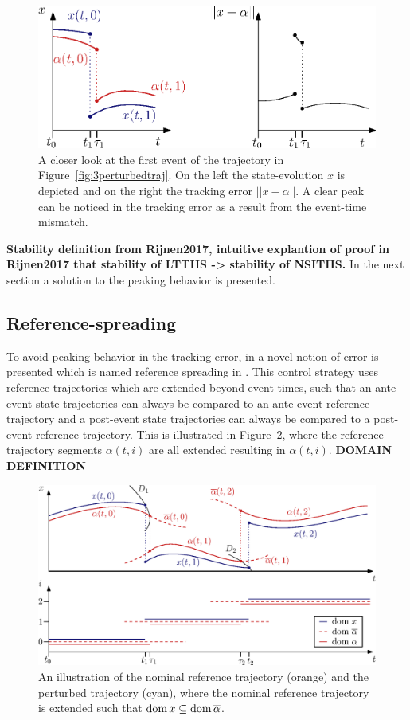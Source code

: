 \documentclass[../DC2017114Bouma.tex]{subfiles}
\begin{document}
\begin{figure}[h]
\centering
\includegraphics[width=.66\textwidth]{peakerror.eps}\caption{A closer look at the first event of the trajectory in Figure~\ref{fig:3perturbedtraj}. On the left the state-evolution $x$ is depicted and on the right the tracking error $||x-\alpha||$. A clear peak can be noticed in the tracking error as a result from the event-time mismatch.} \label{fig:3peakerror}
\end{figure}

\textbf{Stability definition from Rijnen2017, intuitive explantion of proof in Rijnen2017 that stability of LTTHS -> stability of NSITHS.} In the next section a solution to the peaking behavior is presented.

\subsection{Reference-spreading}
To avoid peaking behavior in the tracking error, in \cite{Saccon2014} a novel notion of error is presented which is named reference spreading in \cite{Rijnen2016}. This control strategy uses reference trajectories which are extended beyond event-times, such that an ante-event state trajectories can always be compared to an ante-event reference trajectory and a post-event state trajectories can always be compared to a post-event reference trajectory. This is illustrated in Figure~\ref{fig:3refspread}, where the reference trajectory segments $\alpha(t,i)$ are all extended resulting in $\overline{\alpha}(t,i)$.
\textbf{DOMAIN DEFINITION}
\begin{figure}[h]
\centering
\includegraphics[width=.8\textwidth]{refspreaddom.eps}\caption{An illustration of the nominal reference trajectory (orange) and the perturbed trajectory (cyan), where the nominal reference trajectory is extended such that $\operatorname{\textnormal{dom}} x\subseteq\operatorname{\textnormal{dom}} \overline{\alpha}$.} \label{fig:3refspread}
\end{figure}
\end{document}
